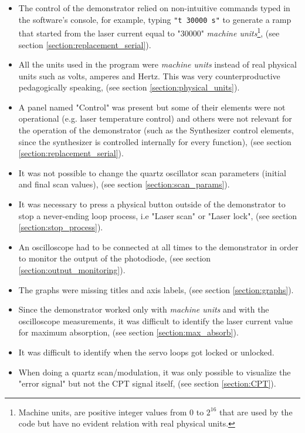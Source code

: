 \documentclass[a4paper,12pt]{article}
\begin{document}
\begin{itemize}
\itemsep 0em %
    \item The control of the demonstrator relied on non-intuitive commands typed in the software's console, for example, typing \texttt{"t 30000 s"} to generate a ramp that started from the laser current equal to "30000" \textit{machine units}\footnote{Machine units, are positive integer values from 0 to $2^{16}$ that are used by the code but have no evident relation with real physical units.}, (see section \ref{section:replacement_serial}).
    \item All the units used in the program were \textit{machine units} instead of real physical units such as volts, amperes and Hertz. This was very counterproductive pedagogically speaking, (see section \ref{section:physical_units}).
    \item A panel named "Control" was present but some of their elements were not operational (e.g. laser temperature control) and others were not relevant for the operation of the demonstrator (such as the Synthesizer control elements, since the synthesizer is controlled internally for every function), (see section \ref{section:replacement_serial}).
    \item It was not possible to change the quartz oscillator scan parameters (initial and final scan values), (see section \ref{section:scan_params}).
    \item It was necessary to press a physical button outside of the demonstrator to stop a never-ending loop process, i.e "Laser scan" or "Laser lock", (see section \ref{section:stop_process}).
    \item An oscilloscope had to be connected at all times to the demonstrator in order to monitor the output of the photodiode, (see section \ref{section:output_monitoring}).
    \item The graphs were missing titles and axis labels, (see section \ref{section:graphs}).
    \item Since the demonstrator worked only with \textit{machine units} and with the oscilloscope measurements, it was difficult to identify the laser current value for maximum absorption, (see section \ref{section:max_absorb}).
    \item It was difficult to identify when the servo loops got locked or unlocked.
    \item When doing a quartz scan\slash modulation, it was only possible to visualize the "error signal" but not the CPT signal itself, (see section \ref{section:CPT}).
    
\end{itemize}
\end{document}
